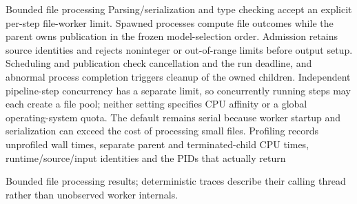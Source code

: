 \documentclass[
  ignorenonframetext,
]{beamer}
\begin{document}
\begin{frame}[allowframebreaks]{Bounded file processing}
\protect{}\label{bounded-file-processing}
Parsing/serialization and type checking accept an explicit per-step
file-worker limit. Spawned processes compute file outcomes while the
parent owns publication in the frozen model-selection order. Admission
retains source identities and rejects noninteger or out-of-range limits
before output setup. Scheduling and publication check cancellation and
the run deadline, and abnormal process completion triggers cleanup of
the owned children. Independent pipeline-step concurrency has a separate
limit, so concurrently running steps may each create a file pool;
neither setting specifies CPU affinity or a global operating-system
quota. The default remains serial because worker startup and
serialization can exceed the cost of processing small files. Profiling
records unprofiled wall times, separate parent and terminated-child CPU
times, runtime/source/input identities and the PIDs that actually return
\end{frame}

\begin{frame}[allowframebreaks]{Bounded file processing}
results; deterministic traces describe their calling thread rather than
unobserved worker internals.
\end{frame}
\end{document}

